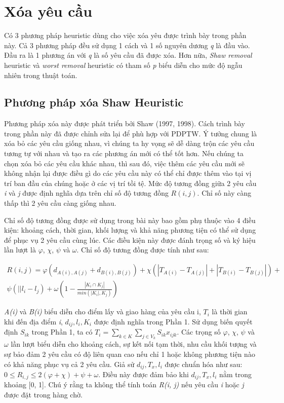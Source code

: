 \section{Xóa yêu cầu}
Có 3 phương pháp heuristic dùng cho việc xóa yêu được trình bày trong phần này. Cả 3 phương pháp đều sử dụng 1 cách và 1 số nguyên dương \textit{q} là đầu vào. Đầu ra là 1 phương án với \textit{q} là số yêu cầu đã được xóa. Hơn nữa, \textit{Shaw removal} heuristic và \textit{worst removal} heuristic có tham số \textit{p} biểu diễn cho mức độ ngẫu nhiên trong thuật toán.

\subsection{Phương pháp xóa Shaw Heuristic}
Phương pháp xóa này được phát triển bởi Shaw (1997, 1998). Cách trình bày trong phần này đã được chỉnh sửa lại để phù hợp với PDPTW. Ý tưởng chung là xóa bỏ các yêu cầu giống nhau, vì chúng ta hy vọng sẽ dễ dàng trộn các yêu cầu tương tự với nhau và tạo ra các phương án mới có thể tốt hơn. Nếu chúng ta chọn xóa bỏ các yêu cầu khác nhau, thì sau đó, việc thêm các yêu cầu mới sẽ không nhận lại được điều gì do các yêu cầu này có thể chỉ được thêm vào tại vị trí ban đầu của chúng hoặc ở các vị trí tồi tệ. Mức độ tương đồng giữa 2 yêu cầu \textit{i} và \textit{j} được định nghĩa dựa trên chỉ số độ tương đồng $R(i,j)$. Chỉ số này càng thấp thì 2 yêu cầu càng giống nhau.

Chỉ số độ tương đồng được sử dụng trong bài này bao gồm phụ thuộc vào 4 điều kiện: khoảng cách, thời gian, khối lượng và khả năng phương tiện có thể sử dụng để phục vụ 2 yêu cầu cùng lúc. Các điều kiện này được đánh trọng số và ký hiệu lần lượt là $\varphi$, $\chi$, $\psi$ và $\omega$. Chỉ số độ tương đồng được tính như sau:

\begin{equation}
\begin{split}
    R(i,j) = \varphi(d_{A(i), A(j)} + d_{B(i), B(j)}) + \chi(|T_{A(i)}-T_{A(j)}| + |T_{B(i)} - T_{B(j)}|)  + \\ \psi(||l_i - l_j) + \omega(1 - \frac{|K_i \cap K_j|}{min(|K_i|, K_j)})
\end{split}
\end{equation}

\textit{A(i)} và \textit{B(i)} biểu diễn cho điểm lấy và giao hàng của yêu cầu i, $T_i$ là thời gian khi đến địa điểm \textit{i}, $d_{ij}, l_{i}, K_i$ được định nghĩa trong Phần 1. Sử dụng biến quyết định $S_{ik}$ trong Phần 1, ta có $T_i = \sum_{k \in K} \sum_{j \in V_k} S_{ik} x_{ijk}$. Các trọng số $\varphi$, $\chi$, $\psi$ và $\omega$ lần lượt biểu diễn cho khoảng cách, sự kết nối tạm thời, nhu cầu khối tượng và sự bảo đảm 2 yêu cầu có độ liên quan cao nếu chỉ 1 hoặc không phương tiện nào có khả năng phục vụ cả 2 yêu cầu. Giả sử $d_{ij}, T_x, l_i$ được chuẩn hóa như sau: $0 \leqslant R_{i,j} \leqslant 2(\varphi + \chi) + \psi + \omega$. Điều này được đảm bảo khi $d_{ij}, T_x, l_i$ nằm trong khoảng [0, 1]. Chú ý rằng ta không thể tính toán \textit{R(i, j)} nếu yêu cầu \textit{i} hoặc \textit{j} được đặt trong hàng chờ.

